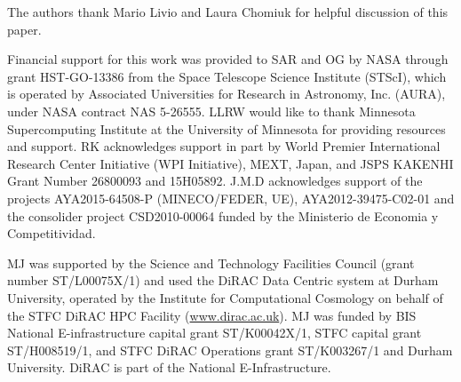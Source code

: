 
\begin{acknowledgments}
The authors thank Mario Livio and Laura Chomiuk for helpful discussion
of this paper.

Financial support for this work was provided to SAR and OG by NASA
through grant HST-GO-13386 from the Space Telescope Science Institute
(STScI), which is operated by Associated Universities for Research in
Astronomy, Inc. (AURA), under NASA contract NAS 5-26555. LLRW would
like to thank Minnesota Supercomputing Institute at the University of
Minnesota for providing resources and support.  RK acknowledges
support in part by World Premier International Research Center
Initiative (WPI Initiative), MEXT, Japan, and JSPS KAKENHI Grant
Number 26800093 and 15H05892.  J.M.D acknowledges support of the
projects AYA2015-64508-P (MINECO/FEDER, UE), AYA2012-39475-C02-01 and
the consolider project CSD2010-00064 funded by the Ministerio de
Economia y Competitividad.

MJ was supported by the Science and Technology Facilities Council
(grant number ST/L00075X/1) and used the DiRAC Data Centric system at
Durham University, operated by the Institute for Computational
Cosmology on behalf of the STFC DiRAC HPC Facility
(\url{www.dirac.ac.uk}).  MJ was funded by BIS National
E-infrastructure capital grant ST/K00042X/1, STFC capital grant
ST/H008519/1, and STFC DiRAC Operations grant ST/K003267/1 and Durham
University. DiRAC is part of the National E-Infrastructure.


\end{acknowledgments}
